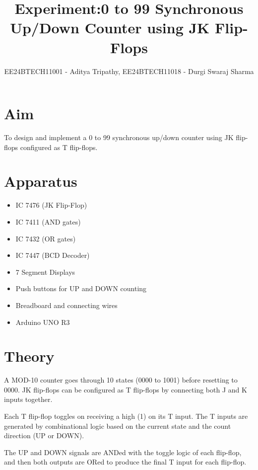 \documentclass[a4paper,12pt]{article}
\title{Experiment:0 to 99 Synchronous Up/Down Counter using JK Flip-Flops}
\author{EE24BTECH11001 - Aditya Tripathy, EE24BTECH11018 - Durgi Swaraj Sharma}
\date{}
\begin{document}
\maketitle

\section*{Aim}
To design and implement a 0 to 99 synchronous up/down counter using JK flip-flops configured as T flip-flops.

\section*{Apparatus}
\begin{itemize}
  \item IC 7476 (JK Flip-Flop)
  \item IC 7411 (AND gates)
  \item IC 7432 (OR gates)
  \item IC 7447 (BCD Decoder)
  \item 7 Segment Displays
  \item Push buttons for UP and DOWN counting
  \item Breadboard and connecting wires
  \item Arduino UNO R3
\end{itemize}

\section*{Theory}
A MOD-10 counter goes through 10 states (0000 to 1001) before resetting to 0000. JK flip-flops can be configured as T flip-flops by connecting both J and K inputs together.

Each T flip-flop toggles on receiving a high (1) on its T input. The T inputs are generated by combinational logic based on the current state and the count direction (UP or DOWN).

The UP and DOWN signals are ANDed with the toggle logic of each flip-flop, and then both outputs are ORed to produce the final T input for each flip-flop.
\end{document}

